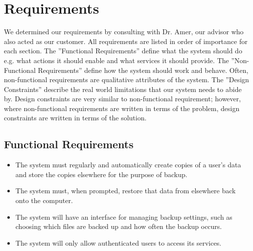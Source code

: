 \chapter {Requirements}

We determined our requirements by consulting with Dr. Amer, our advisor who also acted as our customer.  All requirements are listed in order of importance for each section.  The ''Functional Requirements'' define what the system should do e.g. what actions it should enable and what services it should provide.  The ''Non-Functional Requirements'' define how the system should work and behave.  Often, non-functional requirements are qualitative attributes of the system.  The ''Design Constraints'' describe the real world limitations that our system needs to abide by.  Design constraints are very similar to non-functional requirement; however, where non-functional requirements are written in terms of the problem, design constraints are written in terms of the solution.

\section {Functional Requirements}

	\begin{itemize}
		\item The system must regularly and automatically create copies of a user's data and store the copies elsewhere for the purpose of backup.

		\item The system must, when prompted, restore that data from elsewhere back onto the computer.

		\item The system will have an interface for managing backup settings, such as choosing which files are backed up and how often the backup occurs.

		\item The system will only allow authenticated users to access its services.

	\end{itemize}

